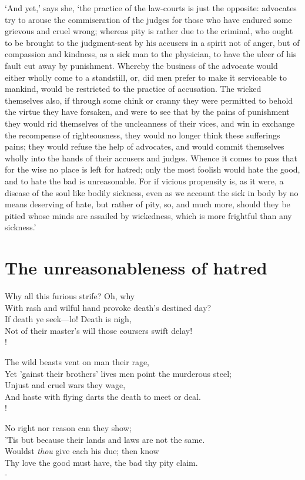 \documentclass[12pt]{book}
\newenvironment{vpoem}[1]%
  {\def\poemvsindentlines{#1}\begin{poem}\small}%
  {\end{poem}\def\poemvsindentlines{\relax}}
\begin{document}
`And yet,' says she, `the practice of the law-courts is just the
opposite: advocates try to arouse the commiseration of the judges for
those who have endured some grievous and cruel wrong; whereas pity is
rather due to the criminal, who ought to be brought to the judgment-seat
by his accusers in a spirit not of anger, but of compassion and
kindness, as a sick man to the physician, to have the ulcer of his fault
cut away by punishment. Whereby the business of the advocate would
either wholly come to a standstill, or, did men prefer to make it
serviceable to mankind, would be restricted to the practice of
accusation. The wicked themselves also, if through some chink or cranny
they were permitted to behold the virtue they have forsaken, and were to
see that by the pains of punishment they would rid themselves of the
uncleanness of their vices, and win in exchange the recompense of
righteousness, they would no longer think these sufferings pains; they
would refuse the help of advocates, and would commit themselves wholly
into the hands of their accusers and judges. Whence it comes to pass
that for the wise no place is left for hatred; only the most foolish
would hate the good, and to hate the bad is unreasonable. For if vicious
propensity is, as it were, a disease of the soul like bodily sickness,
even as we account the sick in body by no means deserving of hate, but
rather of pity, so, and much more, should they be pitied whose minds are
assailed by wickedness, which is more frightful than any sickness.'



\section{The unreasonableness of hatred}

\begin{vpoem}{13}
      Why all this furious strife? Oh, why \\
    With rash and wilful hand provoke death's destined day? \\
      If death ye seek---lo! Death is nigh, \\
    Not of their master's will those coursers swift delay! \\!

      The wild beasts vent on man their rage, \\
    Yet 'gainst their brothers' lives men point the murderous steel; \\
      Unjust and cruel wars they wage, \\
    And haste with flying darts the death to meet or deal. \\!

      No right nor reason can they show; \\
    'Tis but because their lands and laws are not the same. \\
      Wouldst \emph{thou} give each his due; then know \\
    Thy love the good must have, the bad thy pity claim. \\-
\end{vpoem}
\end{document}
